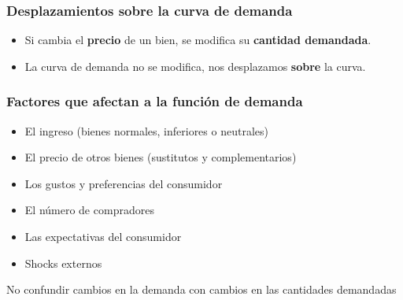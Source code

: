 \documentclass{beamer}
\begin{document}
\begin{frame}
\frametitle{Desplazamientos \textbf{sobre} la curva de demanda}

    \begin{itemize}
        \item Si cambia el \textbf{precio} de un bien, se modifica su \textbf{cantidad demandada}.\vspace{2mm}
        \item La curva de demanda no se modifica, nos desplazamos \textbf{sobre} la curva.\vspace{2mm}
    \end{itemize}
    \begin{center}
    \begin{figure}[H]
    \renewcommand{\figurename}{Figure}
    \begin{center}
    \end{center}
    \end{figure}
    \end{center}
\end{frame}

\begin{frame}
\frametitle{Factores que afectan a la función de demanda}
    \begin{itemize}
        \item El ingreso (bienes normales, inferiores o neutrales)
        \item El precio de otros bienes (sustitutos y complementarios)
        \item Los gustos y preferencias del consumidor
        \item El número de compradores
        \item Las expectativas del consumidor
        \item Shocks externos
    \end{itemize}
    \vspace{2mm}
    \begin{boxB}
    \begin{center}
      No confundir cambios en la demanda con cambios en las cantidades demandadas
    \end{center}
    \end{boxB}
\end{frame}
\end{document}
